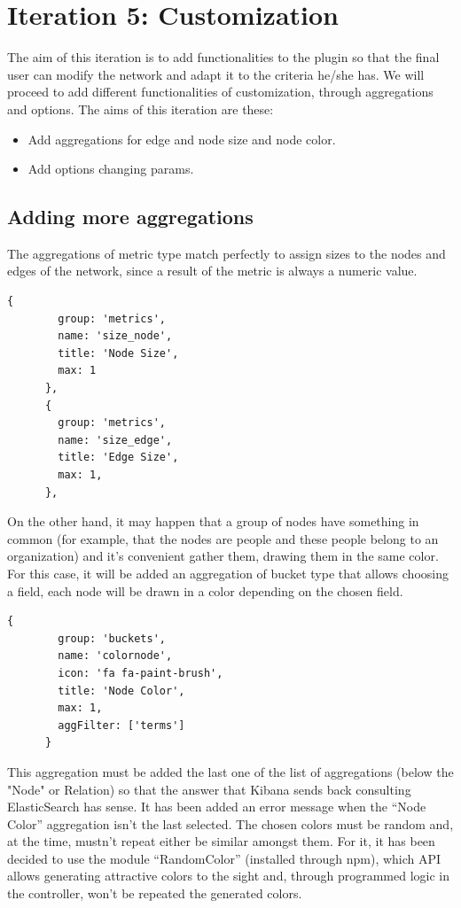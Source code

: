 \documentclass[a4paper, 12pt]{book}
\begin{document}
\section{Iteration 5: Customization}

The aim of this iteration is to add functionalities to the plugin so that the final user can modify the network and adapt it to the criteria he/she has. We will proceed to add different functionalities of customization, through aggregations and options. The aims of this iteration are these:

\begin{itemize}
\item Add aggregations for edge and node size and node color.
\item Add options changing params.
\end{itemize}

\subsection{Adding more aggregations}

The aggregations of metric type match perfectly to assign sizes to the nodes and edges of the network, since a result of the metric is always a numeric value.

\begin{lstlisting}[frame=single]
	  {
        group: 'metrics',
        name: 'size_node',
        title: 'Node Size',
        max: 1
      },
      {
        group: 'metrics',
        name: 'size_edge',
        title: 'Edge Size',
        max: 1,
      },
\end{lstlisting}

On the other hand, it may happen that a group of nodes have something in common (for example, that the nodes are people and these people belong to an organization) and it’s convenient gather them, drawing them in the same color. For this case, it will be added an aggregation of bucket type that allows choosing a field, each node will be drawn in a color depending on the chosen field.

\begin{lstlisting}[frame=single]
      {
        group: 'buckets',
        name: 'colornode',
        icon: 'fa fa-paint-brush',
        title: 'Node Color',
        max: 1,
        aggFilter: ['terms']
      }
\end{lstlisting}

This aggregation must be added the last one of the list of aggregations (below the "Node" or Relation) so that the answer that Kibana sends back consulting ElasticSearch has sense. It has been added an error message when the “Node Color” aggregation isn’t the last selected.
The chosen colors must be random and, at the time, mustn’t repeat either be similar amongst them. For it, it has been decided to use the module “RandomColor” (installed through npm), which API allows generating attractive colors to the sight and, through programmed logic in the controller, won’t be repeated the generated colors.
\end{document}
